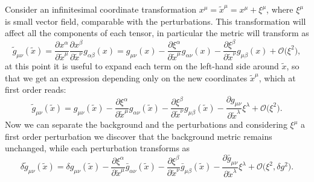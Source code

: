 Consider an infinitesimal coordinate transformation $x^\mu= \tilde x^\mu=x^\mu+\xi^\mu$, where $\xi^\mu$ is small vector field, comparable with the perturbations. This transformation will affect all the components of each tensor, in particular the metric will transform as
$$\tilde g_{\mu\nu}(\tilde x)=\frac{\partial x^\alpha}{\partial\tilde  x^\mu}\frac{\partial  x^\beta}{\partial\tilde x^\nu}g_{\alpha\beta}(x)=g_{\mu\nu}(x)-\frac{\partial \xi^\alpha}{\partial\tilde x^\mu}g_{\alpha\nu}(x)-\frac{\partial \xi^\beta}{\partial\tilde x^\nu}g_{\mu\beta}(x)+\mathcal O\big(\xi^2\big),$$
at this point it is useful to expand each term on the left-hand side around $\tilde x$, so that we get an expression depending only on the new coordinates $\tilde x^\mu$, which at first order reads:
$$\tilde g_{\mu\nu}(\tilde x)=g_{\mu\nu}(\tilde x)-\frac{\partial \xi^\alpha}{\partial \tilde x^\mu}g_{\alpha\nu}(\tilde x)-\frac{\partial \xi^\beta}{\partial \tilde x^\nu}g_{\mu\beta}(\tilde x)-\frac{\partial g_{\mu\nu}}{\partial \tilde x^\lambda}\xi^\lambda+\mathcal O\big(\xi^2\big).$$
Now we can separate the background and the perturbations and considering $\xi^\mu$ a first order perturbation we discover that the background metric remains unchanged, while each perturbation transforms as
\begin{equation}
     \delta \tilde g_{\mu\nu}(\tilde x)=\delta g_{\mu\nu}(\tilde x)-\frac{\partial \xi^\alpha}{\partial \tilde x^\mu}\bar g_{\alpha\nu}(\tilde x)-\frac{\partial \xi^\beta}{\partial \tilde x^\nu}\bar g_{\mu\beta}(\tilde x)-\frac{\partial\bar g_{\mu\nu}}{\partial \tilde x^\lambda}\xi^\lambda+\mathcal O\big(\xi^2,\delta g^2\big).
    \label{eq:perturbation_transformation}
\end{equation} 

